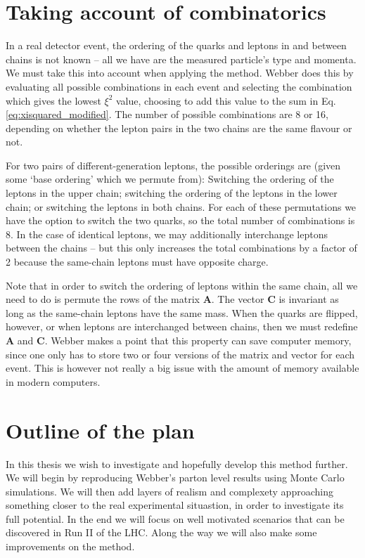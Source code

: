 \documentclass[twoside,english]{uiofysmaster}
\begin{document}
\section{Taking account of combinatorics}
\label{sec:combinatorics}
In a real detector event, the ordering of the quarks and leptons in and between chains is not known -- all we have are the measured particle's type and momenta. We must take this into account when applying the method. Webber does this by evaluating all possible combinations in each event and selecting the combination which gives the lowest $\xi^2$ value, choosing to add this value to the sum in Eq. \eqref{eq:xisquared_modified}. The number of possible combinations are 8 or 16, depending on whether the lepton pairs in the two chains are the same flavour or not. 

For two pairs of different-generation leptons, the possible orderings are (given some `base ordering' which we permute from): Switching the ordering of the leptons in the upper chain; switching the ordering of the leptons in the lower chain; or switching the leptons in both chains. For each of these permutations we have the option to switch the two quarks, so the total number of combinations is 8. In the case of identical leptons, we may additionally interchange leptons between the chains -- but this only increases the total combinations by a factor of 2 because the same-chain leptons must have opposite charge.

Note that in order to switch the ordering of leptons within the same chain, all we need to do is permute the rows of the matrix $\mathbf{A}$. The vector $\mathbf{C}$ is invariant as long as the same-chain leptons have the same mass. When the quarks are flipped, however, or when leptons are interchanged between chains, then we must redefine $\mathbf{A}$ and $\mathbf{C}$. Webber makes a point that this property can save computer memory, since one only has to store two or four versions of the matrix and vector for each event. This is however not really a big issue with the amount of memory available in modern computers. 












\section{Outline of the plan}
In this thesis we wish to investigate and hopefully develop this method further. We will begin by reproducing Webber's parton level results using Monte Carlo simulations. We will then add layers of realism and complexety approaching something closer to the real experimental situastion, in order to investigate its full potential. In the end we will focus on well motivated scenarios that can be discovered in Run II of the LHC.  Along the way we will also make some improvements on the method.
\end{document}
